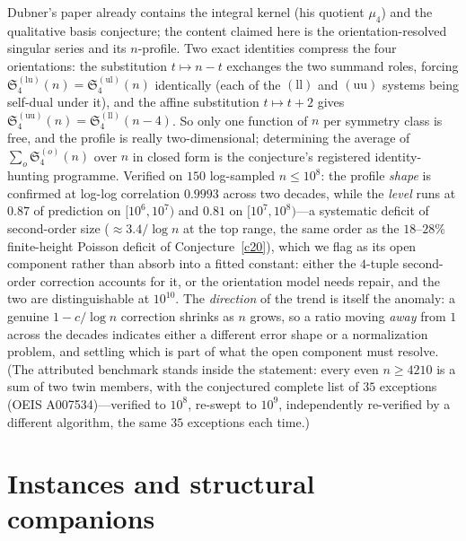 \documentclass[11pt]{article}
\theoremstyle{definition}
\newcommand{\SG}{\mathfrak S}
\begin{document}
Dubner's paper already contains the integral kernel (his quotient
$\mu_4$) and the qualitative basis conjecture; the content claimed here is
the orientation-resolved singular series and its
$n$-profile.  Two exact identities compress the four orientations: the
substitution $t\mapsto n-t$ exchanges the two
summand roles, forcing
$\SG_4^{(\mathrm{lu})}(n)=\SG_4^{(\mathrm{ul})}(n)$ identically
(each of the $(\mathrm{ll})$ and $(\mathrm{uu})$ systems being
self-dual under it), and the affine substitution $t\mapsto t+2$
gives $\SG_4^{(\mathrm{uu})}(n)=\SG_4^{(\mathrm{ll})}(n-4)$.  So
only one function of $n$ per symmetry class is free, and the profile
is really two-dimensional; determining the average of
$\sum_o\SG_4^{(o)}(n)$ over $n$ in closed form is the conjecture's
registered identity-hunting programme.  Verified on $150$ log-sampled
$n\le10^8$: the profile
\emph{shape} is confirmed at log-log correlation $0.9993$ across two
decades, while the \emph{level} runs at $0.87$ of prediction on
$[10^6,10^7)$ and $0.81$ on $[10^7,10^8)$---a systematic deficit of
second-order size (${\approx}3.4/\log n$ at the top range,
the same order as the $18$--$28\%$ finite-height Poisson deficit of
Conjecture~\ref{c20}), which we flag as its open component
rather than absorb into a fitted constant: either the $4$-tuple
second-order correction accounts for it, or the orientation model
needs repair, and the two are distinguishable at $10^{10}$.  The
\emph{direction} of the trend is itself the anomaly: a genuine
$1-c/\log n$ correction shrinks as $n$ grows, so a ratio moving
\emph{away} from $1$ across the decades indicates either a different
error shape or a normalization problem, and settling which is part
of what the open component must resolve.  (The
attributed benchmark stands inside the statement: every even
$n\ge4210$ is a sum of two twin members, with the conjectured
complete list of $35$ exceptions (OEIS A007534)---verified to $10^8$,
re-swept to $10^9$, independently
re-verified by a different algorithm, the same
$35$ exceptions each time.)

\section{Instances and structural companions}
\end{document}
